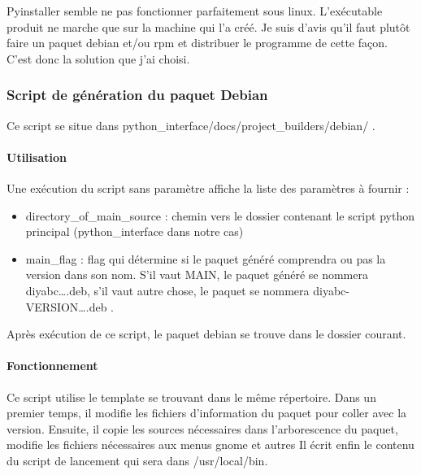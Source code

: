 \documentclass[12pt,a4paper]{article}
\begin{document}
        Pyinstaller semble ne pas fonctionner parfaitement sous linux.
        L'exécutable produit ne marche que sur la machine qui l'a créé. Je suis
        d'avis qu'il faut plutôt faire un paquet debian et/ou rpm et distribuer
        le programme de cette façon. C'est donc la solution que j'ai choisi.
        \subsubsection{Script de génération du paquet Debian}

        Ce script se situe dans python\_interface/docs/project\_builders/debian/ .
        \paragraph{Utilisation}

        Une exécution du script sans paramètre affiche la liste des paramètres à fournir :\\

        \begin{itemize}
            \item directory\_of\_main\_source : chemin vers le dossier contenant le script python principal (python\_interface dans notre cas)
            \item main\_flag : flag qui détermine si le paquet généré comprendra ou pas la version dans son nom. S'il vaut MAIN, le paquet généré
                se nommera diyabc\ldots.deb, s'il vaut autre chose, le paquet se nommera diyabc-VERSION\ldots.deb .\\
        \end{itemize}

        Après exécution de ce script, le paquet debian se trouve dans le dossier courant.

        \paragraph{Fonctionnement}
        Ce script utilise le template se trouvant dans le même répertoire. Dans
        un premier temps, il modifie les fichiers d'information du paquet pour
        coller avec la version. Ensuite, il copie les sources nécessaires dans
        l'arborescence du paquet, modifie les fichiers nécessaires aux menus
        gnome et autres Il écrit enfin le contenu du script de lancement qui
        sera dans /usr/local/bin.
\end{document}
